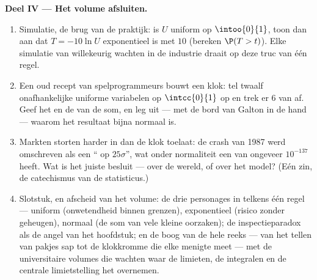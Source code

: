 \begin{problem}
\medskip
\noindent\textbf{Deel IV --- Het volume afsluiten.}
\begin{enumerate}[resume]
  \item Simulatie, de brug van de praktijk: is $U$ uniform op
        $\intoo{0}{1}$, toon dan aan dat $T = -10\ln U$ exponentieel is met
         $10$ (bereken $\P(T > t)$). Elke simulatie van willekeurig
        wachten in de industrie draait op deze truc van één regel.
  \item Een oud recept van spelprogrammeurs bouwt een klok: tel twaalf
        onafhankelijke uniforme variabelen op $\intcc{0}{1}$ op en trek er $6$
        van af. Geef het  en de  van de som, en leg uit ---
        met de bord van Galton in de hand --- waarom het resultaat bijna
        normaal is.
  \item Markten storten harder in dan de klok toelaat: de crash van 1987 werd
        omschreven als een `` op $25\sigma$'', wat onder normaliteit
        een  van ongeveer $10^{-137}$ heeft. Wat is het juiste besluit ---
        over de wereld, of over het model? (Eén zin, de catechismus van de
        statisticus.)
  \item Slotstuk, en afscheid van het volume: de drie personages in telkens
        één regel --- uniform (onwetendheid binnen grenzen), exponentieel
        (risico zonder geheugen), normaal (de som van vele kleine oorzaken);
        de inspectieparadox als de angel van het hoofdstuk; en de boog van de
        hele reeks --- van het tellen van pakjes sap tot de klokkromme die
        elke menigte meet --- met de universitaire volumes die wachten waar de
        limieten, de integralen en de centrale limietstelling het overnemen.
\end{enumerate}
\end{problem}
